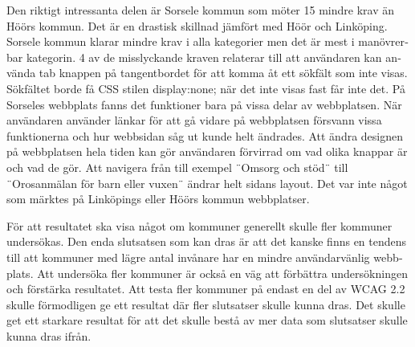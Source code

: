 \documentclass[11p]{article}
\begin{document}
\begin{otherlanguage}{swedish}
    Den riktigt intressanta delen är Sorsele kommun som möter 15 mindre krav än Höörs kommun.
    Det är en drastisk skillnad jämfört med Höör och Linköping.
    Sorsele kommun klarar mindre krav i alla kategorier men det är mest i manövrerbar kategorin.
    4 av de misslyckande kraven relaterar till att användaren kan använda tab knappen på tangentbordet för att komma åt ett sökfält som inte visas.
    Sökfältet borde få CSS stilen display:none; när det inte visas fast får inte det.
    På Sorseles webbplats fanns det funktioner bara på vissa delar av webbplatsen.
    När användaren använder länkar för att gå vidare på webbplatsen försvann vissa funktionerna och hur webbsidan såg ut kunde helt ändrades.
    Att ändra designen på webbplatsen hela tiden kan gör användaren förvirrad om vad olika knappar är och vad de gör.
    Att navigera från till exempel ¨Omsorg och stöd¨ till ¨Orosanmälan för barn eller vuxen¨ ändrar helt sidans layout.
    Det var inte något som märktes på Linköpings eller Höörs kommun webbplatser.


    För att resultatet ska visa något om kommuner generellt skulle fler kommuner undersökas.
    Den enda slutsatsen som kan dras är att det kanske finns en tendens till att kommuner med lägre antal invånare har en mindre användarvänlig webbplats.
    Att undersöka fler kommuner är också en väg att förbättra undersökningen och förstärka resultatet.
    Att testa fler kommuner på endast en del av WCAG 2.2 skulle förmodligen ge ett resultat där fler slutsatser skulle kunna dras.
    Det skulle get ett starkare resultat för att det skulle bestå av mer data som slutsatser skulle kunna dras ifrån.


\end{otherlanguage}
\end{document}
